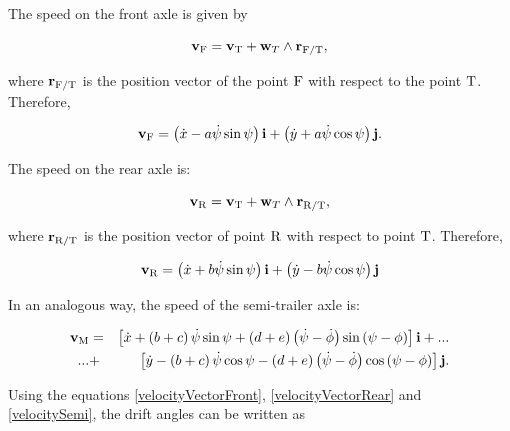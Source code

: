 \documentclass[sublist,a4paper,twoside,11pt]{article}
\begin{document}
The speed on the front axle is given by

\begin{equation}
    {\bf v}_{\rm F} = {\bf v}_{\rm T} + {\bf w}_T \wedge {\bf r}_{{\rm F}/{\rm T}},
\end{equation}

where \({\bf r}_{{\rm F}/{\rm T}}\) is the position vector of the point \({\rm F}\) with respect to the point \({\rm T}\). Therefore,

\begin{equation} \label{velocityVectorFront}
    {\bf v}_{\rm F} = \left( \dot{x} - a \dot{\psi} \sin \psi \right) {\bf i} + \left( \dot{y} + a \dot{\psi} \cos \psi \right) {\bf j}.
\end{equation}

The speed on the rear axle is:

\begin{equation}
    {\bf v}_{\rm R} = {\bf v}_{\rm T} + {\bf w}_T \wedge {\bf r}_{{\rm R}/{\rm T}},
\end{equation}

where \({\bf r}_{{\rm R}/{\rm T}}\) is the position vector of point \({\rm R}\) with respect to point \({\rm T}\). Therefore,

\begin{equation} \label{velocityVectorRear}
    {\bf v}_{\rm R} = \left( \dot{x} + b \dot{\psi} \sin \psi \right) {\bf i} + \left( \dot{y} -b \dot{\psi} \cos \psi \right) {\bf j}
\end{equation}

In an analogous way, the speed of the semi-trailer axle is:

\begin{eqnarray} \label{velocitySemi}
    \nonumber
    {\bf v}_{\rm M} &=& \left[ \dot{x} + \left( b + c \right) \dot{\psi} \sin \psi + \left( d + e \right) \left( \dot{\psi} - \dot{\phi} \right) \sin \left( \psi - \phi \right) \right] {\bf i} + ... \\
    \nonumber
    ... &+& \left[ \dot{y} - \left( b + c \right) \dot{\psi} \cos \psi - \left( d + e \right) \left( \dot{\psi} - \dot{\phi} \right) \cos \left( \psi - \phi \right) \right] {\bf j}. \\
\end{eqnarray}


Using the equations \eqref{velocityVectorFront}, \eqref{velocityVectorRear} and \eqref{velocitySemi}, the drift angles can be written as
\end{document}
